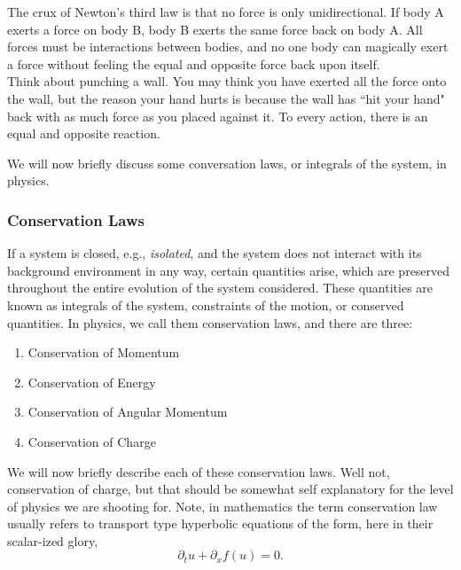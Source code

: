 \begin{itemize}
The crux of Newton's third law is that no force is only unidirectional. If body A exerts a force on body B, body B exerts the same force back on body A. All forces must be interactions between bodies, and no one body can magically exert a force without feeling the equal and opposite force back upon itself. \\

Think about punching a wall. You may think you have exerted all the force onto the wall, but the reason your hand hurts is because the wall has ``hit your hand" back with as much force as you placed against it. To every action, there is an equal and opposite reaction. 

\end{itemize}

We will now briefly discuss some conversation laws, or integrals of the system, in physics.



%
% 

\subsubsection{Conservation Laws}

If a system is closed, e.g., \emph{isolated}, and the system does not interact with its background environment in any way, certain quantities arise, which are preserved throughout the entire evolution of the system considered. These quantities are known as integrals of the system, constraints of the motion, or conserved quantities. In physics, we call them conservation laws, and there are three:

\begin{enumerate}
\item Conservation of Momentum 
\item Conservation of Energy
\item Conservation of Angular Momentum
\item Conservation of Charge
\end{enumerate}

We will now briefly describe each of these conservation laws. Well not, conservation of charge, but that should be somewhat self explanatory for the level of physics we are shooting for. Note, in mathematics the term conservation law usually refers to transport type hyperbolic equations of the form, here in their scalar-ized glory, $$\partial_t u + \partial_x f(u) = 0.$$

